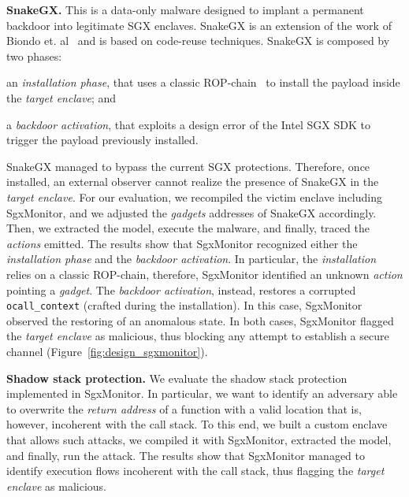 \textbf{SnakeGX.}
This is a data-only malware designed to implant a permanent backdoor into 
legitimate SGX enclaves. 
\textsf{SnakeGX} is an extension of the work of Biondo et. 
al~\citep{biondo2018guard} and is based on code-reuse techniques.
\textsf{SnakeGX} is composed by two phases: 
\begin{enumerate*}[label=(\roman*)]
	\item an \emph{installation phase}, that uses a classic 
	ROP-chain~\citep{carlini2014rop} to install the payload inside 
	the \emph{target enclave}; and
	\item a \emph{backdoor activation}, that exploits a design error of the 
	Intel SGX SDK to trigger the payload previously installed.
\end{enumerate*}
\textsf{SnakeGX} managed to bypass the current SGX protections. 
Therefore, once installed, an external observer cannot realize the presence of
\textsf{SnakeGX} in the \emph{target enclave}.
For our evaluation, we recompiled the victim enclave including SgxMonitor, 
and we adjusted the \emph{gadgets} addresses of \textsf{SnakeGX} accordingly.
Then, we extracted the model, execute the malware, and finally, traced 
the \emph{actions} emitted.
The results show that SgxMonitor recognized either the 
\emph{installation phase} and the \emph{backdoor activation}.
In particular, the \emph{installation} relies on a classic ROP-chain, 
therefore, SgxMonitor identified an unknown \emph{action} pointing a 
\emph{gadget}.
The \emph{backdoor activation}, instead, restores a corrupted 
\texttt{ocall\_context} (crafted during the installation). In this case, 
SgxMonitor observed the restoring of an anomalous state.
In both cases, SgxMonitor flagged the \emph{target enclave} as 
malicious, thus blocking any attempt to establish a secure channel 
(Figure~\ref{fig:design_sgxmonitor}).


\textbf{Shadow stack protection.}
We evaluate the shadow stack protection implemented in SgxMonitor. In 
particular, we want to identify an adversary able to overwrite the 
\emph{return address} of a function with a valid location that 
is, however, incoherent with the call stack.
To this end, we built a custom enclave that allows such attacks, we compiled it 
with SgxMonitor, extracted the model, and finally, run the attack.
The results show that SgxMonitor managed to identify execution 
flows incoherent with the call stack, thus flagging the \emph{target enclave} 
as malicious.

